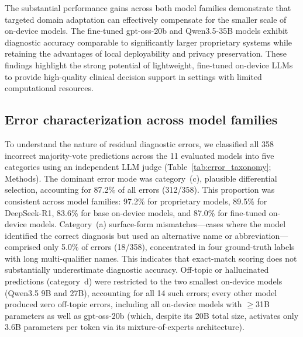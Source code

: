 \documentclass[10pt,journal,compsoc, onecolumn]{IEEEtran}
\begin{document}

The substantial performance gains across both model families demonstrate that targeted domain adaptation can effectively compensate for the smaller scale of on-device models. The fine-tuned gpt-oss-20b and Qwen3.5-35B models exhibit diagnostic accuracy comparable to significantly larger proprietary systems while retaining the advantages of local deployability and privacy preservation. These findings highlight the strong potential of lightweight, fine-tuned on-device LLMs to provide high-quality clinical decision support in settings with limited computational resources.


\subsection*{Error characterization across model families}

To understand the nature of residual diagnostic errors, we classified all 358 incorrect majority-vote predictions across the 11 evaluated models into five categories using an independent LLM judge (Table~\ref{tab:error_taxonomy}; Methods). The dominant error mode was category~(c), plausible differential selection, accounting for 87.2\% of all errors (312/358). This proportion was consistent across model families: 97.2\% for proprietary models, 89.5\% for DeepSeek-R1, 83.6\% for base on-device models, and 87.0\% for fine-tuned on-device models. Category~(a) surface-form mismatches---cases where the model identified the correct diagnosis but used an alternative name or abbreviation---comprised only 5.0\% of errors (18/358), concentrated in four ground-truth labels with long multi-qualifier names. This indicates that exact-match scoring does not substantially underestimate diagnostic accuracy. Off-topic or hallucinated predictions (category~d) were restricted to the two smallest on-device models (Qwen3.5 9B and 27B), accounting for all 14 such errors; every other model produced zero off-topic errors, including all on-device models with $\geq$31B parameters as well as gpt-oss-20b (which, despite its 20B total size, activates only 3.6B parameters per token via its mixture-of-experts architecture).
\end{document}
